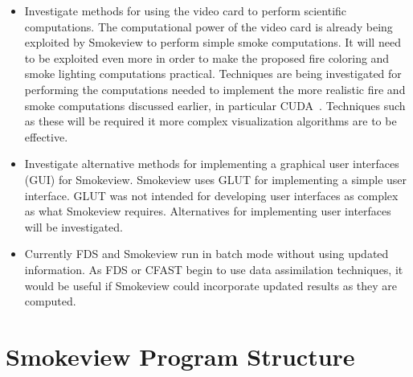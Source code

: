 \documentclass[11pt,twoside]{book}
\begin{document}
\begin{itemize}

\item Investigate methods for using the video card to perform
scientific computations. The computational power of the video card
is already  being exploited by Smokeview to perform simple smoke
computations. It will need to be exploited even more in order to
make the proposed fire coloring and smoke lighting computations
practical. Techniques are being investigated for performing the
computations needed to implement the more realistic fire and smoke
computations discussed earlier, in particular CUDA~\cite{CUDA}.
Techniques such as these will be required it more complex
visualization algorithms are to be effective.

\item Investigate alternative methods for implementing a graphical
user interfaces (GUI) for Smokeview. Smokeview uses GLUT for
implementing a simple user interface.  GLUT was not intended for
developing user interfaces as complex as what Smokeview requires.
Alternatives for implementing user interfaces will be
investigated.

\item Currently FDS and Smokeview run in batch mode without using updated information.
As FDS or CFAST begin to use data assimilation techniques,
it would be useful if Smokeview could incorporate updated results as they are computed.

\end{itemize}

%
%




%
%

\appendix
{}


%
%

\chapter{Smokeview Program Structure}
\label{smvprogstruct}
\end{document}
